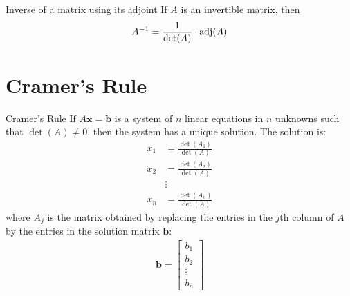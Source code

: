 \documentclass[\main/notes.tex]{subfiles}
\begin{document}
			\begin{theorem}{Inverse of a matrix using its adjoint}
				If $A$ is an invertible matrix, then
				\begin{align*}
					A^{-1} = \frac{1}{\det(A)} \cdot \operatorname{adj}(A)
				\end{align*}
			\end{theorem}

		\section{Cramer's Rule}
			\begin{definition}{Cramer's Rule}
				If $A\mathbf{x} = \mathbf{b}$ is a system of $n$ linear equations in $n$ unknowns such that $\det(A) \neq 0$, then the system has a unique solution. The solution is:
				\begin{align*}
					x_{1} &= \frac{\det(A_{1})}{\det(A)}\\
					x_{2} &= \frac{\det(A_{2})}{\det(A)}\\
					&\vdots\\
					x_{n} &= \frac{\det(A_{n})}{\det(A)}
				\end{align*}
				where $A_{j}$ is the matrix obtained by replacing the entries in the $j$th column of $A$ by the entries in the solution matrix $\mathbf{b}$:
				\begin{align*}
					\mathbf{b} = \begin{bmatrix}
						b_{1}\\
						b_{2}\\
						\vdots\\
						b_{n}
					\end{bmatrix}
				\end{align*}
			\end{definition}
\end{document}
